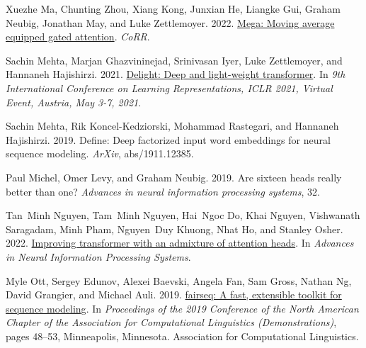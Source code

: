 \documentclass[11pt]{article}
\begin{document}
\begin{thebibliography}{49}
Xuezhe Ma, Chunting Zhou, Xiang Kong, Junxian He, Liangke Gui, Graham Neubig, Jonathan May, and Luke Zettlemoyer. 2022.
\newblock \href {https://doi.org/10.48550/arXiv.2209.10655} {Mega: Moving average equipped gated attention}.
\newblock \emph{CoRR}.

Sachin Mehta, Marjan Ghazvininejad, Srinivasan Iyer, Luke Zettlemoyer, and Hannaneh Hajishirzi. 2021.
\newblock \href {https://openreview.net/forum?id=ujmgfuxSLrO} {Delight: Deep and light-weight transformer}.
\newblock In \emph{9th International Conference on Learning Representations, {ICLR} 2021, Virtual Event, Austria, May 3-7, 2021}.

Sachin Mehta, Rik Koncel-Kedziorski, Mohammad Rastegari, and Hannaneh Hajishirzi. 2019.
\newblock Define: Deep factorized input word embeddings for neural sequence modeling.
\newblock \emph{ArXiv}, abs/1911.12385.

Paul Michel, Omer Levy, and Graham Neubig. 2019.
\newblock Are sixteen heads really better than one?
\newblock \emph{Advances in neural information processing systems}, 32.

Tan~Minh Nguyen, Tam~Minh Nguyen, Hai~Ngoc Do, Khai Nguyen, Vishwanath Saragadam, Minh Pham, Nguyen~Duy Khuong, Nhat Ho, and Stanley Osher. 2022.
\newblock \href {https://openreview.net/forum?id=0VFQhPGF1M3} {Improving transformer with an admixture of attention heads}.
\newblock In \emph{Advances in Neural Information Processing Systems}.

Myle Ott, Sergey Edunov, Alexei Baevski, Angela Fan, Sam Gross, Nathan Ng, David Grangier, and Michael Auli. 2019.
\newblock \href {https://doi.org/10.18653/v1/N19-4009} {fairseq: A fast, extensible toolkit for sequence modeling}.
\newblock In \emph{Proceedings of the 2019 Conference of the North {A}merican Chapter of the Association for Computational Linguistics (Demonstrations)}, pages 48--53, Minneapolis, Minnesota. Association for Computational Linguistics.


\end{thebibliography}
\end{document}
